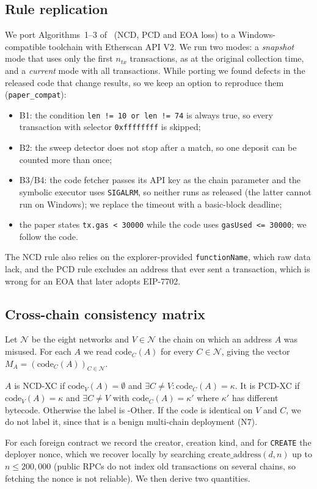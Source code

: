 \documentclass[runningheads]{llncs}
\newcommand{\NCDXC}{\textsf{NCD-XC}}
\newcommand{\PCDXC}{\textsf{PCD-XC}}
\newcommand{\code}[2]{\mathrm{code}_{#1}(#2)}
\begin{document}
\subsection{Rule replication}
\label{sec:replication}
We port Algorithms~1--3 of~\cite{shao2026lost} (NCD, PCD and EOA loss) to a
Windows-compatible toolchain with Etherscan API V2. We run two modes: a
\emph{snapshot} mode that uses only the first $n_{tx}$ transactions, as at the
original collection time, and a \emph{current} mode with all transactions.
While porting we found defects in the released code that change results, so we
keep an option to reproduce them (\texttt{paper\_compat}):
\begin{itemize}
\item B1: the condition \texttt{len != 10 or len != 74} is always true, so every
transaction with selector \texttt{0xffffffff} is skipped;
\item B2: the sweep detector does not stop after a match, so one deposit can be
counted more than once;
\item B3/B4: the code fetcher passes its API key as the chain parameter and the
symbolic executor uses \texttt{SIGALRM}, so neither runs as released (the latter
cannot run on Windows); we replace the timeout with a basic-block deadline;
\item the paper states \texttt{tx.gas < 30000} while the code uses
\texttt{gasUsed <= 30000}; we follow the code.
\end{itemize}
The NCD rule also relies on the explorer-provided \texttt{functionName}, which
raw data lack, and the PCD rule excludes an address that ever sent a
transaction, which is wrong for an EOA that later adopts EIP-7702.

\subsection{Cross-chain consistency matrix}
\label{sec:matrix}
Let $\mathcal{N}$ be the eight networks and $V\in\mathcal{N}$ the chain on which
an address $A$ was misused. For each $A$ we read $\code{C}{A}$ for every
$C\in\mathcal{N}$, giving the vector $M_A=(\code{C}{A})_{C\in\mathcal{N}}$.
\begin{definition}
$A$ is \NCDXC{} if $\code{V}{A}=\emptyset$ and $\exists C\ne V:\code{C}{A}=\kappa$.
It is \PCDXC{} if $\code{V}{A}=\kappa$ and $\exists C\ne V$ with
$\code{C}{A}=\kappa'$ where $\kappa'$ has different bytecode. Otherwise the
label is \textsf{-Other}. If the code is identical on $V$ and $C$, we do not
label it, since that is a benign multi-chain deployment (N7).
\end{definition}
For each foreign contract we record the creator, creation kind, and for
\texttt{CREATE} the deployer nonce, which we recover locally by searching
$\text{create\_address}(d,n)$ up to $n\le200{,}000$ (public RPCs do not index old
transactions on several chains, so fetching the nonce is not reliable). We then
derive two quantities.
\end{document}
